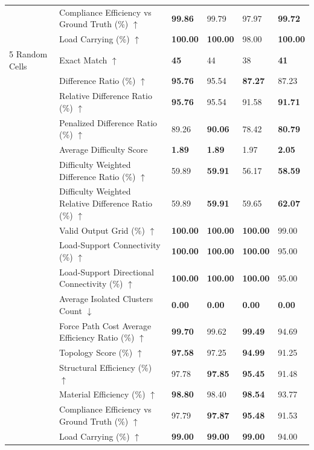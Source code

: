 \begin{table}[!h]
{\begin{tabular}{llll|ll}
 & Compliance Efficiency vs Ground Truth (\%) $\uparrow$ & \textbf{99.86} & 99.79 & 97.97 & \textbf{99.72} \\
 & Load Carrying (\%) $\uparrow$ & \textbf{100.00} & \textbf{100.00} & 98.00 & \textbf{100.00} \\
\midrule
5 Random Cells & Exact Match $\uparrow$ & \textbf{45} & 44 & 38 & \textbf{41} \\
 & Difference Ratio (\%) $\uparrow$ & \textbf{95.76} & 95.54 & \textbf{87.27} & 87.23 \\
 & Relative Difference Ratio (\%) $\uparrow$ & \textbf{95.76} & 95.54 & 91.58 & \textbf{91.71} \\
 & Penalized Difference Ratio (\%) $\uparrow$ & 89.26 & \textbf{90.06} & 78.42 & \textbf{80.79} \\
 & Average Difficulty Score & \textbf{1.89} & \textbf{1.89} & 1.97 & \textbf{2.05} \\
 & Difficulty Weighted Difference Ratio (\%) $\uparrow$ & 59.89 & \textbf{59.91} & 56.17 & \textbf{58.59} \\
 & Difficulty Weighted Relative Difference Ratio (\%) $\uparrow$ & 59.89 & \textbf{59.91} & 59.65 & \textbf{62.07} \\
 & Valid Output Grid (\%) $\uparrow$ & \textbf{100.00} & \textbf{100.00} & \textbf{100.00} & 99.00 \\
 & Load-Support Connectivity (\%) $\uparrow$ & \textbf{100.00} & \textbf{100.00} & \textbf{100.00} & 95.00 \\
 & Load-Support Directional Connectivity (\%) $\uparrow$ & \textbf{100.00} & \textbf{100.00} & \textbf{100.00} & 95.00 \\
 & Average Isolated Clusters Count $\downarrow$ & \textbf{0.00} & \textbf{0.00} & \textbf{0.00} & \textbf{0.00} \\
 & Force Path Cost Average Efficiency Ratio (\%) $\uparrow$ & \textbf{99.70} & 99.62 & \textbf{99.49} & 94.69 \\
 & Topology Score (\%) $\uparrow$ & \textbf{97.58} & 97.25 & \textbf{94.99} & 91.25 \\
 & Structural Efficiency (\%) $\uparrow$ & 97.78 & \textbf{97.85} & \textbf{95.45} & 91.48 \\
 & Material Efficiency (\%) $\uparrow$ & \textbf{98.80} & 98.40 & \textbf{98.54} & 93.77 \\
 & Compliance Efficiency vs Ground Truth (\%) $\uparrow$ & 97.79 & \textbf{97.87} & \textbf{95.48} & 91.53 \\
 & Load Carrying (\%) $\uparrow$ & \textbf{99.00} & \textbf{99.00} & \textbf{99.00} & 94.00 \\

\end{tabular}}
\end{table}
